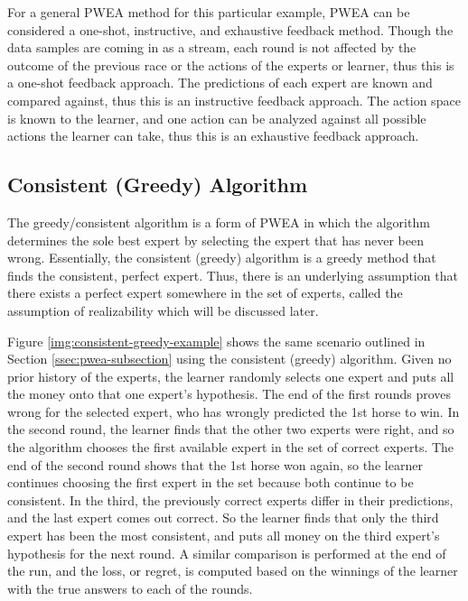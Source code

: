 \documentclass[11pt]{article}
\begin{document}
For a general PWEA method for this particular example, PWEA can be considered a one-shot, instructive, and exhaustive feedback method. Though the data samples are coming in as a stream, each round is not affected by the outcome of the previous race or the actions of the experts or learner, thus this is a one-shot feedback approach. The predictions of each expert are known and compared against, thus this is an instructive feedback approach. The action space is known to the learner, and one action can be analyzed against all possible actions the learner can take, thus this is an exhaustive feedback approach.


\subsection{Consistent (Greedy) Algorithm}

The greedy/consistent algorithm is a form of PWEA in which the algorithm determines the sole best expert by selecting the expert that has never been wrong. Essentially, the consistent (greedy) algorithm is a greedy method that finds the consistent, perfect expert. Thus, there is an underlying assumption that there exists a perfect expert somewhere in the set of experts, called the assumption of realizability which will be discussed later.

Figure \ref{img:consistent-greedy-example} shows the same scenario outlined in Section \ref{ssec:pwea-subsection} using the consistent (greedy) algorithm. Given no prior history of the experts, the learner randomly selects one expert and puts all the money onto that one expert's hypothesis. The end of the first rounds proves wrong for the selected expert, who has wrongly predicted the 1st horse to win. In the second round, the learner finds that the other two experts were right, and so the algorithm chooses the first available expert in the set of correct experts. The end of the second round shows that the 1st horse won again, so the learner continues choosing the first expert in the set because both continue to be consistent. In the third, the previously correct experts differ in their predictions, and the last expert comes out correct. So the learner finds that only the third expert has been the most consistent, and puts all money on the third expert's hypothesis for the next round. A similar comparison is performed at the end of the run, and the loss, or regret, is computed based on the winnings of the learner with the true answers to each of the rounds.
\end{document}
